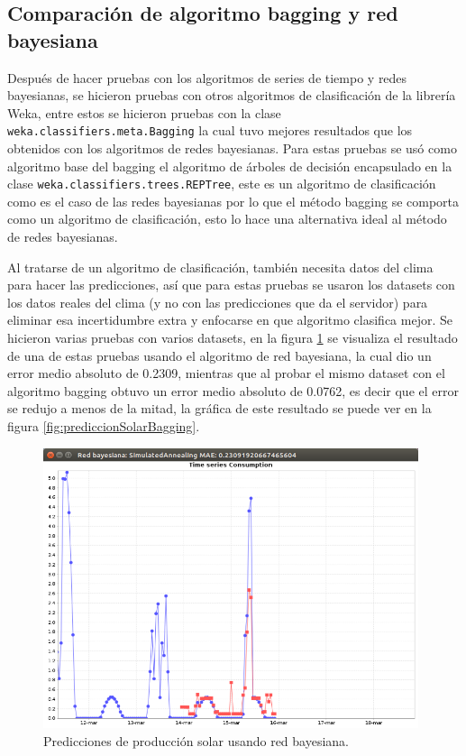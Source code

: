 \subsection{Comparación de algoritmo bagging y red bayesiana} \label{subsec:comparacionBaggingRedB}

Después de hacer pruebas con los algoritmos de series de tiempo y redes bayesianas, se hicieron pruebas con otros algoritmos de clasificación de la librería Weka, entre estos se hicieron pruebas con la clase \texttt{weka.classifiers.meta.Bagging} la cual tuvo mejores resultados que los obtenidos con los algoritmos de redes bayesianas. %
Para estas pruebas se usó como algoritmo base del bagging el algoritmo de árboles de decisión encapsulado en la clase \texttt{weka.classifiers.trees.REPTree}, este es un algoritmo de clasificación como es el caso de las redes bayesianas por lo que el método bagging se comporta como un algoritmo de clasificación, esto lo hace una alternativa ideal al método de redes bayesianas.

Al tratarse de un algoritmo de clasificación, también necesita datos del clima para hacer las predicciones, así que para estas pruebas se usaron los datasets con los datos reales del clima (y no con las predicciones que da el servidor) para eliminar esa incertidumbre extra y enfocarse en que algoritmo clasifica mejor. 
Se hicieron varias pruebas con varios datasets, en la figura \ref{fig:prediccionSolarRedBayesiana} se visualiza el resultado de una de estas pruebas usando el algoritmo de red bayesiana, la cual dio un error medio absoluto de 0.2309, mientras que al probar el mismo dataset con el algoritmo bagging obtuvo un error medio absoluto de 0.0762, es decir que el error se redujo a menos de la mitad, la gráfica de este resultado se puede ver en la figura \ref{fig:prediccionSolarBagging}.

\begin{figure}[h]
	\centering
	\includegraphics[width=11cm]{img/prediccionSolarRedBayesiana.png}
	\caption{Predicciones de producción solar usando red bayesiana.}
	\label{fig:prediccionSolarRedBayesiana}
\end{figure}

